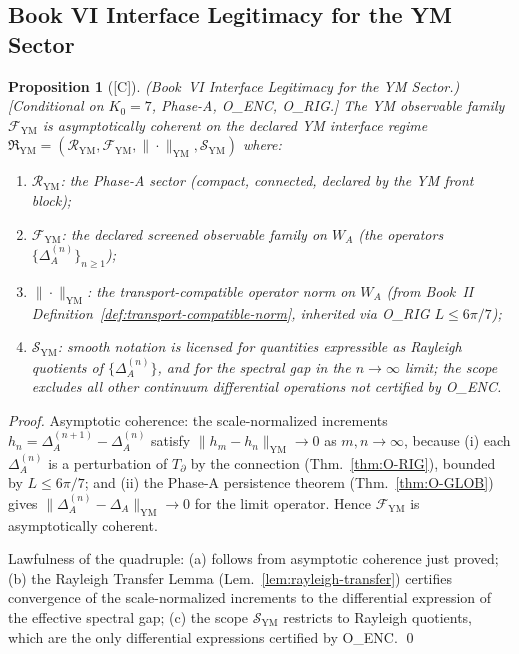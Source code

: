 \documentclass[12pt,oneside]{amsbook}
\theoremstyle{plain}
\newtheorem{proposition}[theorem]{Proposition}
\theoremstyle{definition}
\theoremstyle{remark}
\newcommand{\status}[1]{\textup{[#1]}}
\begin{document}
\subsection{Book VI Interface Legitimacy for the YM Sector}

\begin{proposition}[\status{C}]\label{prop:YM-book-VI-legit}
\textup{(Book~VI Interface Legitimacy for the YM Sector.)}
\textup{[Conditional on $K_0=7$, Phase-A, O\_ENC, O\_RIG.]}
The YM observable family $\mathcal{F}_{\mathrm{YM}}$ is
asymptotically coherent on the declared YM interface regime
$\mathfrak{R}_{\mathrm{YM}} = (\mathcal{R}_{\mathrm{YM}},
\mathcal{F}_{\mathrm{YM}}, \|\cdot\|_{\mathrm{YM}},
\mathcal{S}_{\mathrm{YM}})$ where:
\begin{enumerate}[label=\textup{(\arabic*)}]
 \item $\mathcal{R}_{\mathrm{YM}}$: the Phase-A sector
 (compact, connected, declared by the YM front block);
 \item $\mathcal{F}_{\mathrm{YM}}$: the declared screened
 observable family on $W_A$ (the operators
 $\{\Delta_A^{(n)}\}_{n \geq 1}$);
 \item $\|\cdot\|_{\mathrm{YM}}$: the transport-compatible
 operator norm on $W_A$ (from Book~II Definition~\ref{def:transport-compatible-norm},
 inherited via O\_RIG $L \leq 6\pi/7$);
 \item $\mathcal{S}_{\mathrm{YM}}$: smooth notation is licensed
 for quantities expressible as Rayleigh quotients of
 $\{\Delta_A^{(n)}\}$, and for the spectral gap in the
 $n \to \infty$ limit; the scope excludes all other continuum
 differential operations not certified by O\_ENC.
\end{enumerate}
\end{proposition}

\begin{proof}
Asymptotic coherence: the scale-normalized increments
$h_n = \Delta_A^{(n+1)} - \Delta_A^{(n)}$ satisfy
$\|h_m - h_n\|_{\mathrm{YM}} \to 0$ as $m,n \to \infty$,
because (i) each $\Delta_A^{(n)}$ is a perturbation of
$T_\partial$ by the connection (Thm.~\ref{thm:O-RIG}),
bounded by $L \leq 6\pi/7$; and (ii) the Phase-A persistence
theorem (Thm.~\ref{thm:O-GLOB}) gives $\|\Delta_A^{(n)} -
\Delta_A\|_{\mathrm{YM}} \to 0$ for the limit operator.
Hence $\mathcal{F}_{\mathrm{YM}}$ is asymptotically coherent.

Lawfulness of the quadruple: (a) follows from asymptotic
coherence just proved; (b) the Rayleigh Transfer Lemma
(Lem.~\ref{lem:rayleigh-transfer}) certifies convergence of
the scale-normalized increments to the differential expression
of the effective spectral gap; (c) the scope $\mathcal{S}_{\mathrm{YM}}$
restricts to Rayleigh quotients, which are the only differential
expressions certified by O\_ENC. \qed
\end{proof}
\end{document}
